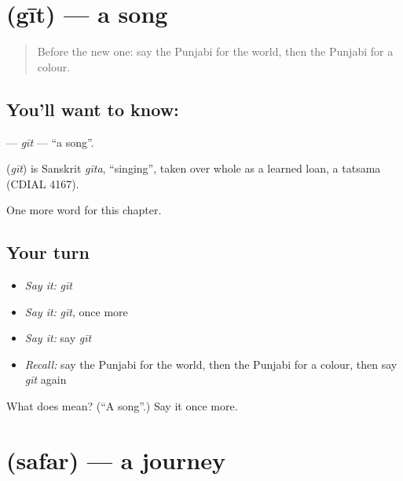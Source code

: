 \section[\texorpdfstring{\pa{ਗੀਤ} (gīt)}{ਗੀਤ (gīt)}]{ (gīt) — a song}

\label{lesson:PA-C97-git}



\begin{quote}
Before the new one: say the Punjabi for the world, then the Punjabi for a colour.
\end{quote}

\subsection*{You'll want to know: }
\textbf{} — \emph{gīt} — \textquotedblleft{}a song\textquotedblright{}.

\begin{cousinweb}
\textbf{} (\emph{gīt}) is Sanskrit \emph{gīta}, \textquotedblleft{}singing\textquotedblright{}, taken over whole as a learned loan, a tatsama (CDIAL 4167).
\end{cousinweb}

\begin{grammarlens}[title={What you've built}]
One more word for this chapter.
\end{grammarlens}

\subsection*{Your turn}
\begin{itemize}
\raggedright
  \item \emph{Say it:} \emph{gīt}
  \item \emph{Say it:} \emph{gīt}, once more
  \item \emph{Say it:} say \emph{gīt}
  \item \emph{Recall:} say the Punjabi for the world, then the Punjabi for a colour, then say \emph{gīt} again
\end{itemize}

\begin{tcolorbox}[breakable,colback=teal!4,colframe=teal!35!black,title={Before you move on}]
What does  mean? (\textquotedblleft{}A song\textquotedblright{}.) Say it once more.
\end{tcolorbox}
\section[\texorpdfstring{\pa{ਸਫ਼ਰ} (safar)}{ਸਫ਼ਰ (safar)}]{ (safar) — a journey}

